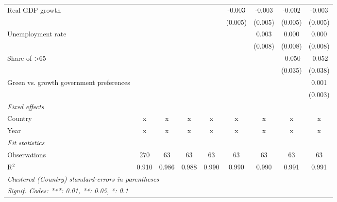 \begin{table}[htbp]
\begin{tabular}{lcccccccc}
      Real GDP growth                                                       &         &         &               &                & -0.003         & -0.003         & -0.002         & -0.003\\   
                                                                            &         &         &               &                & (0.005)        & (0.005)        & (0.005)        & (0.005)\\   
      Unemployment rate                                                     &         &         &               &                &                & 0.003          & 0.000          & 0.000\\   
                                                                            &         &         &               &                &                & (0.008)        & (0.008)        & (0.008)\\   
      Share of >65                                                          &         &         &               &                &                &                & -0.050         & -0.052\\   
                                                                            &         &         &               &                &                &                & (0.035)        & (0.038)\\   
      Green vs. growth government preferences                               &         &         &               &                &                &                &                & 0.001\\   
                                                                            &         &         &               &                &                &                &                & (0.003)\\   
      \emph{Fixed effects}\\
      Country                                                               & x       & x       & x             & x              & x              & x              & x              & x\\  
      Year                                                                  & x       & x       & x             & x              & x              & x              & x              & x\\  
      \midrule \emph{Fit statistics}\\
      Observations                                                          & 270     & 63      & 63            & 63             & 63             & 63             & 63             & 63\\  
      R$^2$                                                                 & 0.910   & 0.986   & 0.988         & 0.990          & 0.990          & 0.990          & 0.991          & 0.991\\  
      \midrule
      \multicolumn{9}{l}{\emph{Clustered (Country) standard-errors in parentheses}}\\
      \multicolumn{9}{l}{\emph{Signif. Codes: ***: 0.01, **: 0.05, *: 0.1}}\\
   \end{tabular}
\end{table}


